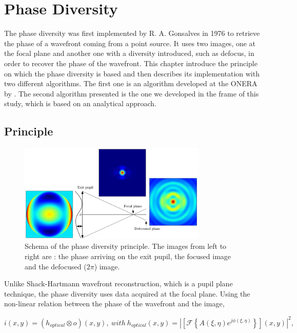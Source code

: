 \chapter{Phase Diversity}
\label{ch:PDThe}

The phase diversity was first implemented by R. A. Gonsalves in 1976 \citep{Gonsalves_1976,Gonsalves_1982} to retrieve the phase of a wavefront coming from a point source. It uses two images, one at the focal plane and another one with a diversity introduced, such as defocus, in order to recover the phase of the wavefront. This chapter introduce the principle on which the phase diversity is based and then describes its implementation with two different algorithms. The first one is an algorithm developed at the ONERA by \citet{mugnier_2006}. The second algorithm presented is the one we developed in the frame of this study, which is based on an analytical approach.

\section{Principle}

\begin{figure}
\begin{center}
\includegraphics[width=0.8\textwidth,angle=0]{Figures/DiversityPrincipleM}
\decoRule
\caption{Schema of the phase diversity principle. The images from left to right are : the phase arriving on the exit pupil, the focused image and the defocused ($2\pi$) image.}
\label{fig:DiversityPrinciple}
\end{center}
\end{figure}

Unlike Shack-Hartmann wavefront reconstruction, which is a pupil plane technique, the phase diversity uses data acquired at the focal plane. Using the non-linear relation between the phase of the wavefront and the image, 

\begin{equation}
i(x,y) = (h_{optical}\otimes o)(x,y), \ with \ h_{optical}(x,y) = |\left[\mathcal{F}\left\lbrace A(\xi,\eta)e^{j\phi(\xi,\eta)} \right\rbrace\right](x,y)|^2,
\label{eqt:img-hopt}
\end{equation}

